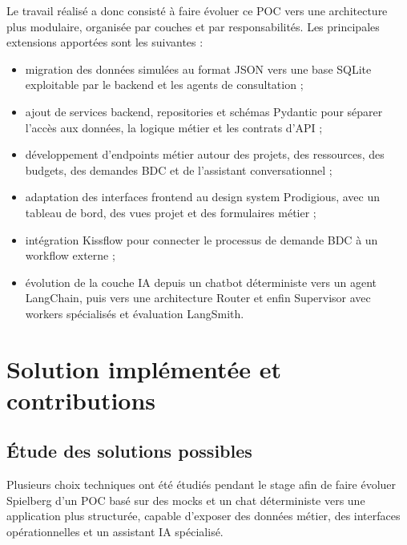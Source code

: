 \documentclass[a4paper,11pt,english,openany]{book}
\begin{document}
Le travail réalisé a donc consisté à faire évoluer ce POC vers une architecture plus modulaire, organisée par couches et par responsabilités. Les principales extensions apportées sont les suivantes :
\begin{itemize}
    \item migration des données simulées au format JSON vers une base SQLite exploitable par le backend et les agents de consultation ;
    \item ajout de services backend, repositories et schémas Pydantic pour séparer l'accès aux données, la logique métier et les contrats d'API ;
    \item développement d'endpoints métier autour des projets, des ressources, des budgets, des demandes BDC et de l'assistant conversationnel ;
    \item adaptation des interfaces frontend au design system Prodigious, avec un tableau de bord, des vues projet et des formulaires métier ;
    \item intégration Kissflow pour connecter le processus de demande BDC à un workflow externe ;
    \item évolution de la couche IA depuis un chatbot déterministe vers un agent LangChain, puis vers une architecture Router et enfin Supervisor avec workers spécialisés et évaluation LangSmith.
\end{itemize}

\chapter{Solution implémentée et contributions}

\section{Étude des solutions possibles}

Plusieurs choix techniques ont été étudiés pendant le stage afin de faire évoluer Spielberg d'un POC basé sur des mocks et un chat déterministe vers une application plus structurée, capable d'exposer des données métier, des interfaces opérationnelles et un assistant IA spécialisé.
\end{document}
